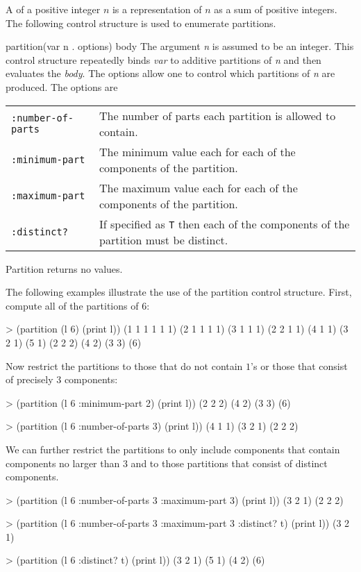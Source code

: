 A  of a positive integer $n$ is a representation of $n$
as a sum of positive integers. The following control structure is used
to enumerate partitions.
  
\begin{specialdef}{partition}{(var n . options) \body body}
The argument {\em n} is assumed to be an integer.
This control structure repeatedly binds {\em var} to
additive partitions of {\em n} and then evaluates the
{\em body}.  The options allow one to control which partitions
of {\em n} are produced. The options are

\begin{center}
\begin{tabular}{lp{4in}}
{\tt :number-of-parts} & The number of parts each partition is
allowed to contain. \\
{\tt :minimum-part} & The minimum value each for each of the components
of the partition. \\
{\tt :maximum-part} & The maximum value each for each of the components
of the partition. \\
{\tt :distinct?} & If specified as {\tt T} then each of the
components of the partition must be distinct. 
\end{tabular}
\end{center}

\noindent
{\sf Partition} returns no values.
\end{specialdef}
  
The following examples illustrate the use of the partition control
structure. First, compute all of the partitions of 6:
\begin{code}
> (partition (l 6) (print l))
(1 1 1 1 1 1)
(2 1 1 1 1)
(3 1 1 1)
(2 2 1 1)
(4 1 1)
(3 2 1)
(5 1)
(2 2 2)
(4 2)
(3 3)
(6)
\end{code}
  
\noindent
Now restrict the partitions to those that do not contain $1$'s or
those that consist of precisely $3$ components:
\begin{code}  
> (partition (l 6 :minimum-part 2)
    (print l))
(2 2 2)
(4 2)
(3 3)
(6)
  
> (partition (l 6 :number-of-parts 3)
    (print l))
(4 1 1)
(3 2 1)
(2 2 2)
\end{code}
  
We can further restrict the partitions to only include components that
contain components no larger than $3$ and to those partitions that
consist of distinct components.
\begin{code}  
> (partition (l 6 :number-of-parts 3 :maximum-part 3)
    (print l))
(3 2 1)
(2 2 2)
  
> (partition (l 6 :number-of-parts 3 :maximum-part 3 :distinct? t)
    (print l)) 
(3 2 1)
  
> (partition (l 6 :distinct? t)
    (print l))
(3 2 1)
(5 1)
(4 2)
(6)
\end{code}
  
